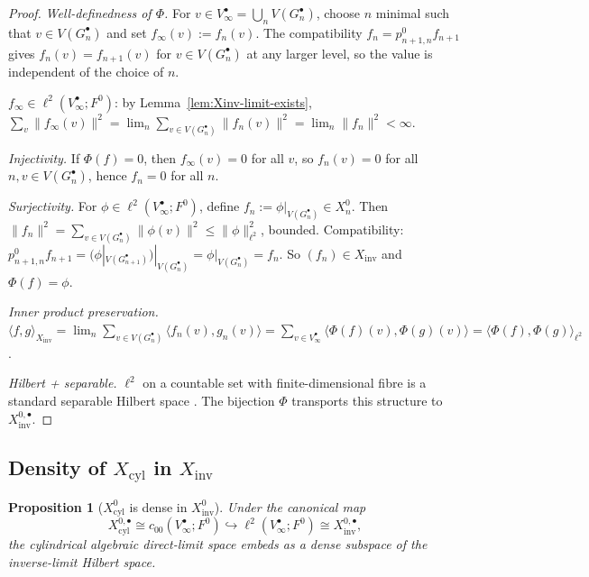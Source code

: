 \documentclass[11pt, a4paper]{amsart}
\newtheorem{proposition}[theorem]{Proposition}
\theoremstyle{definition}
\newcommand{\inv}{\mathrm{inv}}
\newcommand{\cyl}{\mathrm{cyl}}
\begin{document}
\begin{proof}
\emph{Well-definedness of $\Phi$.} For $v \in V_\infty^\bullet =
\bigcup_n V(G_n^\bullet)$, choose $n$ minimal such that $v \in
V(G_n^\bullet)$ and set $f_\infty(v) := f_n(v)$. The compatibility
$f_n = p_{n+1, n}^0 f_{n+1}$ gives $f_n(v) = f_{n+1}(v)$ for
$v \in V(G_n^\bullet)$ at any larger level, so the value is
independent of the choice of $n$.

$f_\infty \in \ell^2(V_\infty^\bullet; F^0)$: by
Lemma~\ref{lem:Xinv-limit-exists}, $\sum_v \|f_\infty(v)\|^2 =
\lim_n \sum_{v \in V(G_n^\bullet)} \|f_n(v)\|^2 = \lim_n
\|f_n\|^2 < \infty$.

\emph{Injectivity.} If $\Phi(f) = 0$, then $f_\infty(v) = 0$ for
all $v$, so $f_n(v) = 0$ for all $n, v \in V(G_n^\bullet)$, hence
$f_n = 0$ for all $n$.

\emph{Surjectivity.} For $\phi \in \ell^2(V_\infty^\bullet; F^0)$,
define $f_n := \phi|_{V(G_n^\bullet)} \in X_n^0$. Then
$\|f_n\|^2 = \sum_{v \in V(G_n^\bullet)} \|\phi(v)\|^2 \leq
\|\phi\|^2_{\ell^2}$, bounded. Compatibility: $p_{n+1, n}^0
f_{n+1} = (\phi|_{V(G_{n+1}^\bullet)})|_{V(G_n^\bullet)} =
\phi|_{V(G_n^\bullet)} = f_n$. So $(f_n) \in X_\inv$ and
$\Phi(f) = \phi$.

\emph{Inner product preservation.}
$\langle f, g \rangle_{X_\inv} = \lim_n \sum_{v \in V(G_n^
\bullet)} \langle f_n(v), g_n(v) \rangle = \sum_{v \in V_\infty^
\bullet} \langle \Phi(f)(v), \Phi(g)(v) \rangle =
\langle \Phi(f), \Phi(g) \rangle_{\ell^2}$.

\emph{Hilbert + separable.} $\ell^2$ on a countable set with
finite-dimensional fibre is a standard separable Hilbert space
\cite[Ch.~II.4]{ReedSimonI}. The bijection $\Phi$ transports
this structure to $X_\inv^{0, \bullet}$.
\end{proof}

\subsection{Density of $X_\cyl$ in $X_\inv$}

\begin{proposition}[$X_\cyl^0$ is dense in $X_\inv^0$]
\label{prop:Xcyl-dense}
Under the canonical map
\[
  X_\cyl^{0, \bullet} \cong c_{00}(V_\infty^\bullet; F^0)
    \hookrightarrow \ell^2(V_\infty^\bullet; F^0) \cong
    X_\inv^{0, \bullet},
\]
the cylindrical algebraic direct-limit space embeds as a dense
subspace of the inverse-limit Hilbert space.
\end{proposition}
\end{document}
